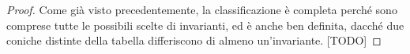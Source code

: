 \documentclass[11pt]{article}
\begin{document}
	\vskip 0.1in

	\begin{proof}
		Come già visto precedentemente, la classificazione è completa perché sono comprese tutte le possibili
		scelte di invarianti, ed è anche ben definita, dacché
		due coniche distinte della tabella differiscono di almeno un'invariante. [TODO]
	\end{proof}
\end{document}
